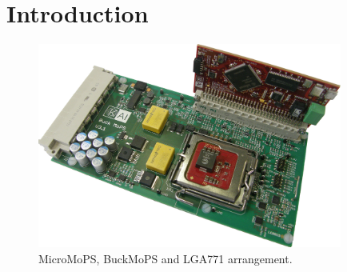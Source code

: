 \chapter{Introduction}

\begin{figure}
	\centering
	\includegraphics[trim=0 0 0 0, clip, width=100mm, scale=0.75]{images/Buck_and_uMoPS_2.jpg}
	\caption{MicroMoPS, BuckMoPS and LGA771 arrangement.}
	\label{fig:combination}
\end{figure}

